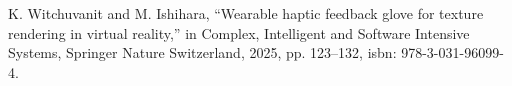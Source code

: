 \label{ap:research_list}



%

	\begin{enumerate}
		 K. Witchuvanit and M. Ishihara, “Wearable haptic feedback glove for texture rendering in virtual reality,” in Complex, Intelligent and Software Intensive Systems, Springer Nature Switzerland, 2025, pp. 123–132, isbn: 978-3-031-96099-4.
	\end{enumerate}
	
	
